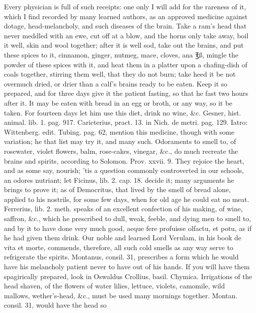 Every physician is full of such receipts: one only I will add for the
rareness of it, which I find recorded by many learned authors, as an
approved medicine against dotage, head-melancholy, and such diseases of
the brain. Take a ram's head that never meddled with an ewe, cut
off at a blow, and the horns only take away, boil it well, skin and
wool together; after it is well sod, take out the brains, and put these
spices to it, cinnamon, ginger, nutmeg, mace, cloves, ana ℥ß, mingle
the powder of these spices with it, and heat them in a platter upon a
chafing-dish of coals together, stirring them well, that they do not
burn; take heed it be not overmuch dried, or drier than a calf's brains
ready to be eaten. Keep it so prepared, and for three days give it the
patient fasting, so that he fast two hours after it. It may be eaten
with bread in an egg or broth, or any way, so it be taken. For fourteen
days let him use this diet, drink no wine, \&c. Gesner, hist. animal.
lib. 1. pag. 917. Caricterius, pract. 13. in Nich. de metri. pag. 129.
Iatro: Wittenberg. edit. Tubing. pag. 62, mention this medicine, though
with some variation; he that list may try it, and many such.
Odoraments to smell to, of rosewater, violet flowers, balm, rose-cakes,
vinegar, \&c., do much recreate the brains and spirits, according to
Solomon. Prov. xxvii. 9. They rejoice the heart, and as some say,
nourish; 'tis a question commonly controverted in our schools, an
odores nutriant; let Ficinus, lib. 2. cap. 18. decide it; many
arguments he brings to prove it; as of Democritus, that lived by the
smell of bread alone, applied to his nostrils, for some few days, when
for old age he could eat no meat. Ferrerius, lib. 2. meth. speaks of an
excellent confection of his making, of wine, saffron, \&c., which he
prescribed to dull, weak, feeble, and dying men to smell to, and by it
to have done very much good, aeque fere profuisse olfactu, et potu, as
if he had given them drink. Our noble and learned Lord Verulam,
in his book de vita et morte, commends, therefore, all such cold smells
as any way serve to refrigerate the spirits. Montanus, consil. 31,
prescribes a form which he would have his melancholy patient never to
have out of his hands. If you will have them spagirically prepared,
look in Oswaldus Crollius, basil. Chymica.
Irrigations of the head shaven, of the flowers of water lilies,
lettuce, violets, camomile, wild mallows, wether's-head, \&c., must be
used many mornings together. Montan. consil. 31, would have the head so
